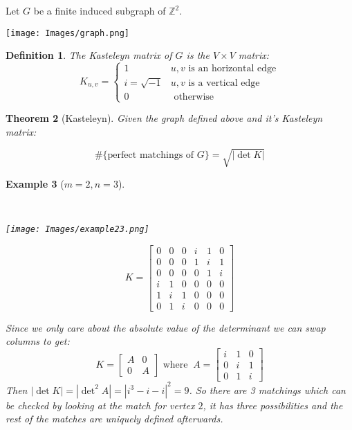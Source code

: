 \documentclass[11pt]{article}
\newtheorem{theorem}{Theorem}
\newtheorem{definition}[theorem]{Definition}
\newtheorem{example}[theorem]{Example}
\begin{document}
Let $G$ be a finite induced subgraph of $\mathbb{Z}^2$.
    \begin{center}
 	\texttt{[image: Images/graph.png]}
	\end{center}
	
\begin{definition}The \emph{Kasteleyn matrix} of $G$ is the $V\times V$ matrix:
\[
K_{u,v}=
\left\{\begin{array}{cc}1 & u,v \text{ is an horizontal edge} \\i=\sqrt{-1} & u,v \text{ is a vertical edge} \\0 & \text{ otherwise}\end{array}\right.
\]
 \end{definition}

\begin{theorem}[Kasteleyn] 
Given the graph defined above and it's Kasteleyn matrix:


\[
\#\{\text{perfect matchings of } G\}=\sqrt{|\det K|}
\]

\end{theorem}



\begin{example}[$m=2,n=3$]

\

\begin{multicols}{2}
\


    \begin{center}
 	\texttt{[image: Images/example23.png]}
	\end{center}

\[
K=\left[\begin{array}{cccccc}0 & 0 & 0 & i & 1 & 0 \\0 & 0 & 0 & 1 & i & 1 \\0 & 0 & 0 & 0 & 1 & i \\i & 1 & 0 & 0 & 0 & 0 \\1 & i & 1 & 0 & 0 & 0 \\0 & 1 & i & 0 & 0 & 0\end{array}\right]
\]

\end{multicols}

Since we only care about the absolute value of the determinant we can swap columns to get:
\[
K=\left[\begin{array}{c|c}
 A & 0 \\ \hline
  0& A
   \end{array}\right]
   \text{ where } \ 
A=\left[\begin{array}{ccc}i & 1 & 0 \\0 & i & 1 \\0 & 1 & i\end{array}\right]
\]
Then $|\det K|=|\det^2 A|=|i^3-i-i|^2=9$. 
So there are 3 matchings which can be checked by looking at the match for vertex $2$, it has three possibilities and the rest of the matches are uniquely defined afterwards.
\end{example}
\end{document}
